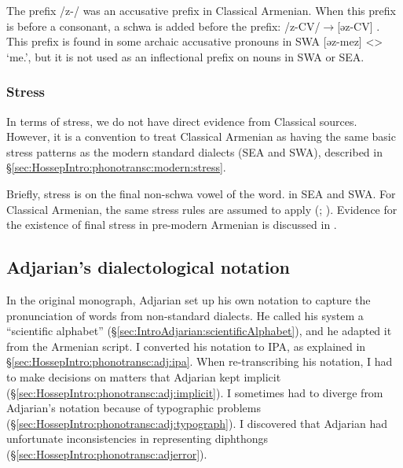 \documentclass[output=paper]{langscibook}
\begin{document}
The prefix /z-/ was an accusative prefix in Classical Armenian. When this prefix is before a consonant, a schwa is added before the prefix: /z-CV/$\rightarrow$[əz-CV] \citep[116]{Thomson-1989-IntroClassicalArmenian}. This prefix   is found in some archaic accusative pronouns in SWA [əz-mez] <> `me.{\acc}', but it is not used as an inflectional prefix on nouns in  SWA or SEA. 




\subsubsection{Stress}\label{sec:HossepIntro:phonotransc:CA:stress}
\largerpage[-1]
 
In terms of stress, we do not have direct evidence from Classical sources. However, it is a convention to treat Classical Armenian as having the same basic stress patterns as the modern standard dialects (SEA and SWA), described in \S\ref{sec:HossepIntro:phonotransc:modern:stress}. 

Briefly, stress  is on the final non-schwa vowel of the word. in SEA and SWA. For Classical Armenian, the same stress rules are assumed to apply (\citealt[15]{Thomson-1989-IntroClassicalArmenian}; \citealt[1043-4]{Macak-2017-PhonoClassicalArmenian}). Evidence for the existence of final stress in pre-modern Armenian is discussed in \citet{DeLisi-2018-ArmenianProsodyDiachrony}.





\subsection{Adjarian's dialectological notation}\label{sec:HossepIntro:phonotransc:adj}


In the original monograph, Adjarian set up his own notation to capture the pronunciation of words from  non-standard dialects. He called his system a ``scientific alphabet''  (\S\ref{sec:IntroAdjarian:scientificAlphabet}), and he adapted it from the Armenian script. I converted his notation to IPA, as explained in \S\ref{sec:HossepIntro:phonotransc:adj:ipa}. When re-transcribing his notation, I had to make decisions on matters that Adjarian kept implicit (\S\ref{sec:HossepIntro:phonotransc:adj:implicit}). I sometimes had to diverge from Adjarian's notation because of   typographic problems (\S\ref{sec:HossepIntro:phonotransc:adj:typograph}). I discovered that Adjarian had unfortunate inconsistencies in representing diphthongs (\S\ref{sec:HossepIntro:phonotransc:adjerror}).
\end{document}
